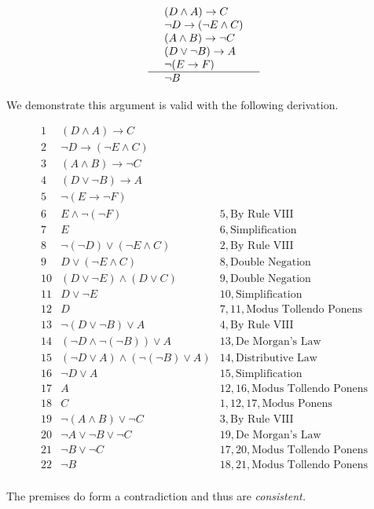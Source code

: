 \documentclass{article}
\theoremstyle{definition}
\begin{document}
	\[\begin{array}{llr}
		  & (D \wedge A) \rightarrow C &\\
		  & \neg D \rightarrow (\neg E \wedge C) & \\
		  & (A \wedge B) \rightarrow \neg C & \\
		  & (D \vee \neg B) \rightarrow A & \\
		  & \neg (E \rightarrow F) & \\
		  \hline
		  & \neg B &
	\end{array}\]

	We demonstrate this argument is valid with the following derivation.

	\[\begin{array}{llr}
		  1 & (D \wedge A) \rightarrow C \\
		  2 & \neg D \rightarrow (\neg E \wedge C) \\
		  3 & (A \wedge B) \rightarrow \neg C \\
		  4 & (D \vee \neg B) \rightarrow A \\
		  5 & \neg (E \rightarrow \neg F) \\
		  \hline
		  6 & E \wedge \neg (\neg F) & 5, \mbox{By Rule VIII} \\
		  7 & E & 6, \mbox{Simplification}\\
		  8 & \neg (\neg D) \vee (\neg E \wedge C) & 2, \mbox{By Rule VIII} \\
		  9 & D \vee (\neg E \wedge C) & 8, \mbox{Double Negation} \\
		  10 & (D \vee \neg E) \wedge (D \vee C) & 9, \mbox{Double Negation} \\
		  11 & D \vee \neg E & 10, \mbox{Simplification} \\
		  12 & D & 7, 11, \mbox{Modus Tollendo Ponens} \\
		  13 & \neg (D \vee \neg B) \vee A & 4, \mbox{By Rule VIII} \\
		  14 & (\neg D \wedge \neg (\neg B)) \vee A & 13, \mbox{De Morgan's Law} \\
		  15 & (\neg D \vee A) \wedge (\neg (\neg B) \vee A) & 14, \mbox{Distributive Law} \\
		  16 & \neg D \vee A & 15, \mbox{Simplification} \\
		  17 & A & 12, 16, \mbox{Modus Tollendo Ponens} \\
		  18 & C & 1, 12, 17, \mbox{Modus Ponens} \\
		  19 & \neg (A \wedge B) \vee \neg C & 3, \mbox{By Rule VIII} \\
		  20 & \neg A \vee \neg B \vee \neg C & 19, \mbox{De Morgan's Law} \\
		  21 & \neg B \vee \neg C & 17, 20, \mbox{Modus Tollendo Ponens} \\
		  22 & \neg B & 18, 21, \mbox{Modus Tollendo Ponens} \\
	\end{array}\]

	The premises do form a contradiction and thus are \emph{consistent.}
\end{document}
